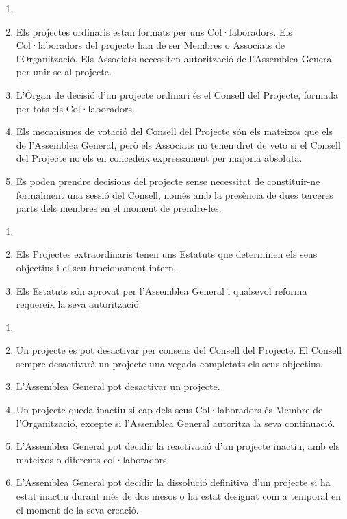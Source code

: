 \documentclass[12pt]{article}
\begin{document}
\begin{art}
    \begin{enumerate}[1.]
        \item[]
        \item Els projectes ordinaris estan formats per uns Col·laboradors. Els Col·laboradors del projecte han de ser Membres o Associats de l'Organització. Els Associats necessiten autorització de l'Assemblea General per unir-se al projecte.
        \item L'Òrgan de decisió d'un projecte ordinari és el Consell del Projecte, formada per tots els Col·laboradors.
        \item Els mecanismes de votació del Consell del Projecte són els mateixos que els de l'Assemblea General, però els Associats no tenen dret de veto si el Consell del Projecte no els en concedeix expressament per majoria absoluta.
        \item Es poden prendre decisions del projecte sense necessitat de constituir-ne formalment una sessió del Consell, només amb la presència de dues terceres parts dels membres en el moment de prendre-les.
    \end{enumerate}
\end{art}

\begin{art}
    \begin{enumerate}[1.]
        \item[]
        \item Els Projectes extraordinaris tenen uns Estatuts que determinen els seus objectius i el seu funcionament intern.
        \item Els Estatuts són aprovat per l'Assemblea General i qualsevol reforma requereix la seva autorització.
    \end{enumerate}
\end{art}

\begin{art}
    \begin{enumerate}[1.]
        \item[]
        \item Un projecte es pot desactivar per consens del Consell del Projecte. El Consell sempre desactivarà un projecte una vegada completats els seus objectius.
        \item L'Assemblea General pot desactivar un projecte.
        \item Un projecte queda inactiu si cap dels seus Col·laboradors és Membre de l'Organització, excepte si l'Assemblea General autoritza la seva continuació.
        \item L'Assemblea General pot decidir la reactivació d'un projecte inactiu, amb els mateixos o diferents col·laboradors.
        \item L'Assemblea General pot decidir la dissolució definitiva d'un projecte si ha estat inactiu durant més de dos mesos o ha estat designat com a temporal en el moment de la seva creació.
    \end{enumerate}
\end{art}
\end{document}
